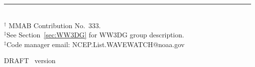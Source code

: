 \vfill

\noindent \rule{140mm}{0.5mm} \\
{\small $^\dag$ MMAB Contribution No.~333. \\
$^\ddag$See Section~\ref{sec:WW3DG} for WW3DG group description.\\
$^\ddag$Code manager email: NCEP.List.WAVEWATCH@noaa.gov}

\bpage

\pb

         {{\rm DRAFT} \hspace{20.5mm} \ws\ version \WWver}
\pagestyle{myheadings}
\setcounter{page}{1}

\cftsetpnumwidth{3em}
\cftsetrmarg{4em}  %

\tableofcontents

\pb
\pagestyle{empty}
\bpagea

\pb
\pagestyle{myheadings}




